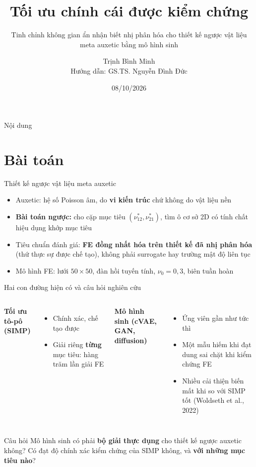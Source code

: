 \documentclass[aspectratio=169,11pt]{beamer}
\title[Tối ưu chính cái được kiểm chứng]{Tối ưu chính cái được kiểm chứng}
\subtitle{Tinh chỉnh không gian ẩn nhận biết nhị phân hóa cho thiết kế
ngược vật liệu meta auxetic bằng mô hình sinh}
\author[Trịnh Bình Minh]{Trịnh Bình Minh\\[2pt]
  {\small Hướng dẫn: GS.TS. Nguyễn Đình Đức}}
\date{08/10/2026}
\newcommand{\nuot}{\nu_{12}}
\newcommand{\nuto}{\nu_{21}}
\begin{document}
\begin{frame}
  \titlepage
\end{frame}

\begin{frame}{Nội dung}
  \tableofcontents
\end{frame}

\section{Bài toán}

\begin{frame}{Thiết kế ngược vật liệu meta auxetic}
  \begin{itemize}
    \item Auxetic: hệ số Poisson âm, do \textbf{vi kiến trúc} chứ không do
      vật liệu nền
    \item \textbf{Bài toán ngược:} cho cặp mục tiêu $(\nuot^{*},\nuto^{*})$,
      tìm ô cơ sở 2D có tính chất hiệu dụng khớp mục tiêu
    \item Tiêu chuẩn đánh giá: \textbf{FE đồng nhất hóa trên thiết kế đã
      nhị phân hóa} (thứ thực sự được chế tạo), không phải surrogate hay
      trường mật độ liên tục
    \item Mô hình FE: lưới $50\times50$, đàn hồi tuyến tính, $\nu_0=0{,}3$,
      biên tuần hoàn
  \end{itemize}
\end{frame}

\begin{frame}{Hai con đường hiện có và câu hỏi nghiên cứu}
  \begin{columns}[T]
    \textbf{Tối ưu tô-pô (SIMP)}
    \begin{itemize}
      \item Chính xác, chế tạo được
      \item Giải riêng \textbf{từng} mục tiêu: hàng trăm lần giải FE
    \end{itemize}
    \textbf{Mô hình sinh (cVAE, GAN, diffusion)}
    \begin{itemize}
      \item Ứng viên gần như tức thì
      \item Một mẫu hiếm khi đạt dung sai chặt khi kiểm chứng FE
      \item Nhiều cải thiện biến mất khi so với SIMP tốt
        (Woldseth et al., 2022)
    \end{itemize}
  \end{columns}
  \vspace{6mm}
  \begin{block}{Câu hỏi}
    Mô hình sinh có phải \textbf{bộ giải thực dụng} cho thiết kế ngược
    auxetic không? Có đạt độ chính xác kiểm chứng của SIMP không, và
    \textbf{với những mục tiêu nào}?
  \end{block}
\end{frame}
\end{document}

